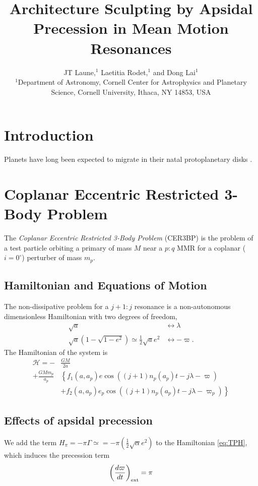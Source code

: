 \documentclass[usenatbib,twocolumn]{mnras}
\title[Apsidal Precession in MMR]{Architecture Sculpting by Apsidal Precession in Mean Motion Resonances}
\author[Laune et al.]{ JT Laune,$^{1}$ Laetitia Rodet,$^{1}$ and Dong
  Lai$^{1}$
  \\
  $^{1}$Department of Astronomy, Cornell Center for Astrophysics and
  Planetary Science, Cornell University, Ithaca, NY 14853, USA \\}
\begin{document}
\maketitle
\section{Introduction}
    Planets have long been expected to migrate in their natal protoplanetary disks \citep[PPDs; e.g.][]{nelson00_migrat_growt_protop_protos_discs}.

\section{Coplanar Eccentric Restricted 3-Body Problem}
\label{sec:CER3BP}
The \emph{Coplanar Eccentric Restricted 3-Body Problem} (CER3BP) is the problem of a test particle orbiting a primary of mass $M$ near a $p:q$ MMR for a coplanar ($i=0^\circ$) perturber of mass $m_p$.

\subsection{Hamiltonian and Equations of Motion}
The non-dissipative problem for a $j+1:j$ resonance is a non-autonomous dimensionless Hamiltonian with two degrees of freedom,
\begin{align}
    \sqrt{a} &\longleftrightarrow \lambda\\
    \sqrt{a}(1-\sqrt{1-e^2})\simeq \frac12\sqrt{a}e^2&\longleftrightarrow -\varpi.
\end{align}
The Hamiltonian of the system is 
\begin{align}
    \label{eq:TPH}
    \mathcal H=-&\frac{GM}{2a}\nonumber\\
    +\frac{GMm_p}{a_p}&\left\{
        f_1(a,a_p)e\cos((j+1)n_p(a_p)t-j\lambda-\varpi)\right.\\
        &\left. +f_2(a,a_p)e_p\cos((j+1)n_p(a_p)t-j\lambda-\varpi_p)
    \right\}\nonumber
\end{align}

\subsection{Effects of apsidal precession}
\label{sec:}
We add the term $H_{\pi} = -\pi\Gamma\simeq = -\pi\left(\frac12\sqrt{\alpha}e^2\right)$ to the Hamiltonian \ref{eq:TPH}, which induces the precession term
\begin{equation}
    \left(\frac{d\varpi}{dt}\right)_{\rm ext} = \pi
\end{equation}
\end{document}
